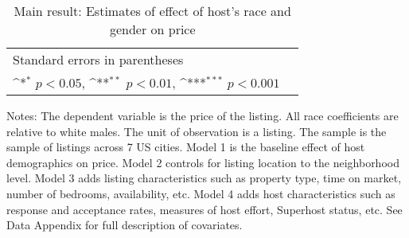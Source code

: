 \documentclass[11pt, oneside]{article}
\begin{document}

\newpage


\newpage


\newpage


\newpage

\begin{table}[htbp]
	\def\sym#1{\ifmmode^{#1}\else\(^{#1}\)\fi}
	\caption{Main result: Estimates of effect of host’s race and gender on price}
	\begin{tabular}{l*{5}{c}}
		\hline\hline

	\hline\hline
	\multicolumn{5}{l}{\footnotesize Standard errors in parentheses}\\
	\multicolumn{5}{l}{\footnotesize \sym{*} \(p<0.05\), \sym{**} \(p<0.01\), \sym{***} \(p<0.001\)}\\
	\end{tabular}

	\begin{tablenotes}
	
	\item Notes: The dependent variable is the price of the listing. All race coefficients are relative to white males. The unit of observation is a listing. The sample is the sample of listings across 7 US cities. Model 1 is the baseline effect of host demographics on price. Model 2 controls for listing location to the neighborhood level. Model 3 adds listing characteristics such as property type, time on market, number of bedrooms, availability, etc. Model 4 adds host characteristics such as response and acceptance rates, measures of host effort, Superhost status, etc. See Data Appendix for full description of covariates.  
\end{tablenotes}
\end{table}
\end{document}
